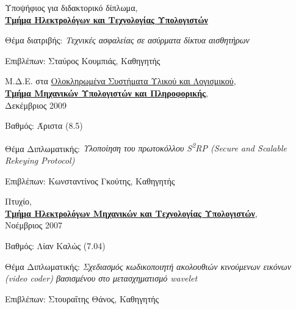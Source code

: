\documentclass[11pt]{article}
\newenvironment{outerlist}[1][\enskip\textbullet]%
        {\begin{itemize}[#1]}{\end{itemize}%
         \vspace{-.6\baselineskip}}
\newenvironment{innerlist}[1][\enskip\textbullet]%
        {\begin{compactitem}[#1]}{\end{compactitem}}
\newcommand{\grt}{\greektext}
\newcommand{\lat}{\latintext}
\begin{document}
\begin{outerlist}

\item[] Υποψήφιος για διδακτορικό δίπλωμα,\\
        \href{http://www.ece.upatras.gr/}
             {\textbf{Τμήμα Ηλεκτρολόγων και Τεχνολογίας Υπολογιστών}}
        \begin{innerlist}
        \item Θέμα διατριβής: \emph{Τεχνικές ασφαλείας σε ασύρματα δίκτυα αισθητήρων}
        \item Επιβλέπων:
                   {Σταύρος Κουμπιάς, Καθηγητής}
        \end{innerlist}

\item[] Μ.Δ.Ε. στα
        \href{http://www.upatras.gr/hw-sw/}
             {Ολοκληρωμένα Συστήματα Υλικού και Λογισμικού},\\
        \href{http://www.ceid.upatras.gr/}
             {\textbf{Τμήμα Μηχανικών Υπολογιστών και Πληροφορικής}},\\
	    Δεκέμβριος 2009
        \begin{innerlist}
        \item Βαθμός: Άριστα (8.5)
        \item Θέμα Διπλωματικής: \emph{Υλοποίηση του πρωτοκόλλου \lat S\textsuperscript{2}RP (Secure and Scalable Rekeying Protocol)}
        \item Επιβλέπων:
              {Κωνσταντίνος Γκούτης, Καθηγητής}
        \end{innerlist}

\item[] Πτυχίο,\\
        \href{http://www.ece.upatras.gr/}
             {\textbf{Τμήμα Ηλεκτρολόγων Μηχανικών και Τεχνολογίας Υπολογιστών}},\\ Νοέμβριος 2007
        \begin{innerlist}
        \item Βαθμός: Λίαν Καλώς (7.04)
        \item Θέμα Διπλωματικής: \emph{Σχεδιασμός κωδικοποιητή ακολουθιών κινούμενων εικόνων \lat(video coder)
\grt βασισμένου στο μετασχηματισμό \lat wavelet}
        \item Επιβλέπων:
              {Στουραΐτης Θάνος, Καθηγητής}
        \end{innerlist}

\end{outerlist}
\end{document}
